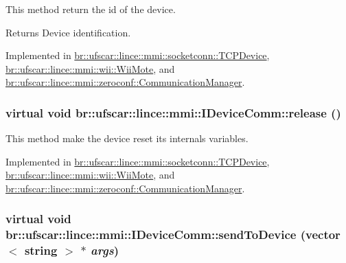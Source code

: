 This method return the id of the device. 

\begin{DoxyReturn}{Returns}
Device identification. 
\end{DoxyReturn}


Implemented in \hyperlink{classbr_1_1ufscar_1_1lince_1_1mmi_1_1socketconn_1_1TCPDevice_aa45bb0937e02c3d58c9923c369408e5a}{br::ufscar::lince::mmi::socketconn::TCPDevice}, \hyperlink{classbr_1_1ufscar_1_1lince_1_1mmi_1_1wii_1_1WiiMote_a125dc3805711f4b5fa9327ebf719e035}{br::ufscar::lince::mmi::wii::WiiMote}, and \hyperlink{classbr_1_1ufscar_1_1lince_1_1mmi_1_1zeroconf_1_1CommunicationManager_ac81ba73dafe9e2ca558fad5d46f09e8c}{br::ufscar::lince::mmi::zeroconf::CommunicationManager}.

\hypertarget{classbr_1_1ufscar_1_1lince_1_1mmi_1_1IDeviceComm_a9c173ebb83a502e78143a52fc7d87a80}{
\subsubsection[{release}]{\setlength{\rightskip}{0pt plus 5cm}virtual void br::ufscar::lince::mmi::IDeviceComm::release ()}}
\label{classbr_1_1ufscar_1_1lince_1_1mmi_1_1IDeviceComm_a9c173ebb83a502e78143a52fc7d87a80}


This method make the device reset its internals variables. 



Implemented in \hyperlink{classbr_1_1ufscar_1_1lince_1_1mmi_1_1socketconn_1_1TCPDevice_a4004f2bdb8466c2613654469d0863f78}{br::ufscar::lince::mmi::socketconn::TCPDevice}, \hyperlink{classbr_1_1ufscar_1_1lince_1_1mmi_1_1wii_1_1WiiMote_a4d17da2514583aa3787a1d9fda1cd74c}{br::ufscar::lince::mmi::wii::WiiMote}, and \hyperlink{classbr_1_1ufscar_1_1lince_1_1mmi_1_1zeroconf_1_1CommunicationManager_aef7bfab9cd63ab8e75fb0782e019574b}{br::ufscar::lince::mmi::zeroconf::CommunicationManager}.

\hypertarget{classbr_1_1ufscar_1_1lince_1_1mmi_1_1IDeviceComm_a0249a13030b4df9b50778723421375d9}{
\subsubsection[{sendToDevice}]{\setlength{\rightskip}{0pt plus 5cm}virtual void br::ufscar::lince::mmi::IDeviceComm::sendToDevice (vector$<$ string $>$ $\ast$ {\em args})}}
\label{classbr_1_1ufscar_1_1lince_1_1mmi_1_1IDeviceComm_a0249a13030b4df9b50778723421375d9}


